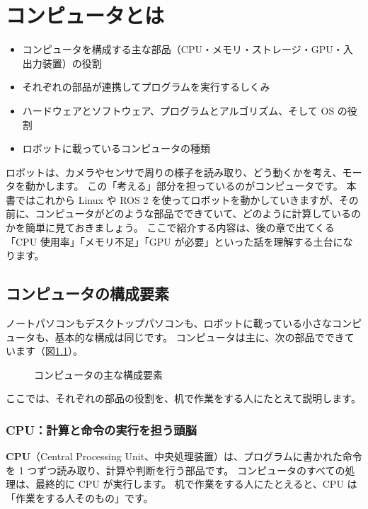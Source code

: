 \chapter{コンピュータとは}
\label{chap:computer}

\begin{goalbox}
  \begin{itemize}
    \item コンピュータを構成する主な部品（CPU・メモリ・ストレージ・GPU・入出力装置）の役割
    \item それぞれの部品が連携してプログラムを実行するしくみ
    \item ハードウェアとソフトウェア、プログラムとアルゴリズム、そして OS の役割
    \item ロボットに載っているコンピュータの種類
  \end{itemize}
\end{goalbox}

ロボットは、カメラやセンサで周りの様子を読み取り、どう動くかを考え、モータを動かします。
この「考える」部分を担っているのがコンピュータです。
本書ではこれから Linux や ROS 2 を使ってロボットを動かしていきますが、その前に、コンピュータがどのような部品でできていて、どのように計算しているのかを簡単に見ておきましょう。
ここで紹介する内容は、後の章で出てくる「CPU 使用率」「メモリ不足」「GPU が必要」といった話を理解する土台になります。

\section{コンピュータの構成要素}
\label{sec:computer-parts}

ノートパソコンもデスクトップパソコンも、ロボットに載っている小さなコンピュータも、基本的な構成は同じです。
コンピュータは主に、次の部品でできています（図\ref{fig:computer-parts}）。

\begin{figure}[tb]
  \centering
  
  \caption{コンピュータの主な構成要素}
  \label{fig:computer-parts}
\end{figure}

ここでは、それぞれの部品の役割を、机で作業をする人にたとえて説明します。

\subsection{CPU：計算と命令の実行を担う頭脳}

\textbf{CPU}（Central Processing Unit、中央処理装置）は、プログラムに書かれた命令を 1 つずつ読み取り、計算や判断を行う部品です。
コンピュータのすべての処理は、最終的に CPU が実行します。
机で作業をする人にたとえると、CPU は「作業をする人そのもの」です。


